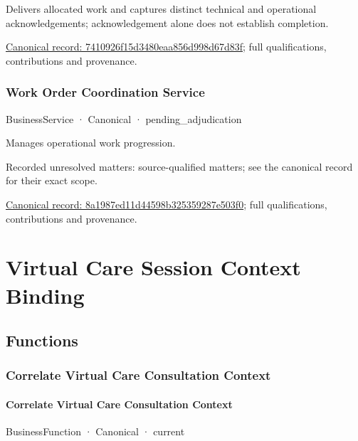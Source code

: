 Delivers allocated work and captures distinct technical and operational acknowledgements; acknowledgement alone does not establish completion.


{\footnotesize \href{../../../../continuum/business/business-service/7410926f15d3480eaa856d998d67d83f.md}{Canonical record: 7410926f15d3480eaa856d998d67d83f}; full qualifications, contributions and provenance.}\par
\subsubsection{Work Order Coordination Service}

\label{element:8a1987ed11d44598b325359287e503f0}
{\small BusinessService · Canonical · pending\_adjudication}\par

Manages operational work progression.


{\small Recorded unresolved matters: source-qualified matters; see the canonical record for their exact scope.}\par
{\footnotesize \href{../../../../continuum/business/business-service/8a1987ed11d44598b325359287e503f0.md}{Canonical record: 8a1987ed11d44598b325359287e503f0}; full qualifications, contributions and provenance.}\par
\section{Virtual Care Session Context Binding}

\subsection{Functions}

\subsubsection{Correlate Virtual Care Consultation Context}

\paragraph{Correlate Virtual Care Consultation Context}

\label{element:d315a7eab4d9453f83ecd44ed8b57b56}
{\small BusinessFunction · Canonical · current}\par

